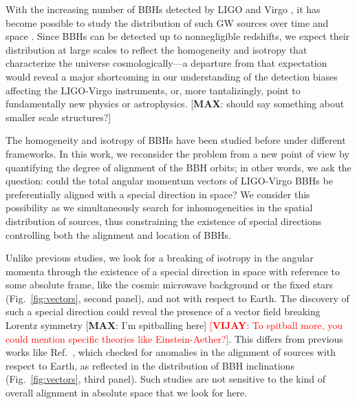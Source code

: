 \documentclass[aps,prd,twocolumn,superscriptaddress,preprintnumbers,floatfix,nofootinbib]{revtex4-2}
\newcommand*{\mi}[1]{{\color{magenta} [{\bf MAX}: #1]}}
\newcommand*{\vv}[1]{\textcolor{red}{[\textbf{VIJAY}: #1]}}
\begin{document}
With the increasing number of \acp{BBH} detected by LIGO \cite{TheLIGOScientific:2014jea} and Virgo \cite{TheVirgo:2014hva}, it has become possible to study the distribution of such \ac{GW} sources over time and space \cite{LIGOScientific:2021psn,Fishbach:2018edt,Fishbach:2021yvy,Stiskalek:2020wbj,Payne:2020pmc,Cavaglia:2020fnc,Essick:2022slj}.
Since \acp{BBH} can be detected up to nonnegligible redshifts, we expect their distribution at large scales to reflect the homogeneity and isotropy that characterize the universe cosmologically---a departure from that expectation would reveal a major shortcoming in our understanding of the detection biases affecting the LIGO-Virgo instruments, or, more tantalizingly, point to fundamentally new physics or astrophysics.
 \mi{should say something about smaller scale structures?}

The homogeneity \cite{Stiskalek:2020wbj,Payne:2020pmc,Cavaglia:2020fnc,Essick:2022slj} and isotropy \cite{Vitale:2022pmu} of \acp{BBH} have been studied before under different frameworks.
In this work, we reconsider the problem from a new point of view by quantifying the degree of alignment of the \ac{BBH} orbits; in other words, we ask the question: could the total angular momentum vectors of LIGO-Virgo \acp{BBH} be preferentially aligned with a special direction in space?
We consider this possibility as we simultaneously search for inhomogeneities in the spatial distribution of sources, thus constraining the existence of special directions controlling both the alignment and location of \acp{BBH}.

Unlike previous studies, we look for a breaking of isotropy in the angular momenta through the existence of a special direction in space with reference to some absolute frame, like the cosmic microwave background or the fixed stars (Fig.~\ref{fig:vectors}, second panel), and not with respect to Earth.
The discovery of such a special direction could reveal the presence of a vector field breaking Lorentz symmetry \mi{I'm spitballing here} \vv{To spitball more, you could mention specific theories like Einstein-Aether?}.
This differs from previous works like Ref.~\cite{Vitale:2022pmu}, which checked for anomalies in the alignment of sources with respect to Earth, as reflected in the distribution of \ac{BBH} inclinations (Fig.~\ref{fig:vectors}, third panel).
Such studies are not sensitive to the kind of overall alignment in absolute space that we look for here.
\end{document}
